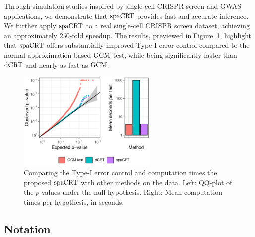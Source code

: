 \documentclass[12pt]{article}
\theoremstyle{definition}
\newcommand{\dCRT}{\textnormal{dCRT}} 					%
\newcommand{\GCM}{\textnormal{GCM}}						%
\newcommand{\spacrt}{\textnormal{spaCRT}}               %
\begin{document}
  Through simulation studies inspired by single-cell CRISPR screen and GWAS applications, we demonstrate that $\spacrt$ provides fast and accurate inference. We further apply $\spacrt$ to a real single-cell CRISPR screen dataset, achieving an approximately 250-fold speedup. The results, previewed in Figure~\ref{fig:dCRT_GCM_binomial_poisson}, highlight that $\spacrt$ offers substantially improved Type I error control compared to the normal approximation-based $\GCM$ test, while being significantly faster than $\dCRT$ and nearly as fast as $\GCM$. 
  \begin{figure}[h!]
	  \centering
	  \includegraphics[width=0.6\textwidth]{figures-and-tables/motivating_example.pdf} 
	  \caption{\small{Comparing the Type-I error control and computation times the proposed $\spacrt$ with other methods on the \citet{Gasperini2019a} data. Left: QQ-plot of the $p$-values under the null hypothesis. Right: Mean computation times per hypothesis, in seconds.}}
	  \label{fig:dCRT_GCM_binomial_poisson} 
  \end{figure}
  
  
  \subsection{Notation}
  
\end{document}
